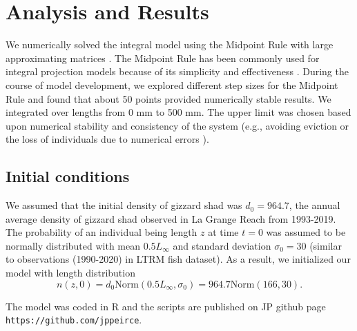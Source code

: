 \documentclass[preprint,review,12pt,authoryear]{elsarticle}
\begin{document}
\section{Analysis and Results}
We numerically solved the integral model using the Midpoint Rule with large approximating matrices \citep{burden2005numerical}. 
The Midpoint Rule has been commonly used for integral projection models because of its simplicity and effectiveness \citep{ellner2006integral, ramula2009integral,  merow2014advancing}. 
During the course of model development, we explored different step sizes for the Midpoint Rule and found that about 50 points provided numerically stable results. 
We integrated over lengths from 0 mm to 500 mm. 
The upper limit was chosen based upon numerical stability and consistency of the system (e.g., avoiding eviction or the loss of individuals due to numerical errors \citep{williams2012avoiding}). 

\subsection{Initial conditions}  We assumed that the initial density of gizzard shad was $d_0 = 964.7$, the annual average density of gizzard shad observed in La Grange Reach from 1993-2019.  
The probability of an individual being length $z$ at time $t=0$  was assumed to be normally distributed with mean $0.5L_\infty$ and standard deviation $\sigma_0 = 30$ (similar to observations (1990-2020) in LTRM fish dataset).  
As a result, we initialized our model with length distribution
\begin{equation}\label{eq:n}
 n(z,0) = d_0 \mbox{Norm} (0.5 L_\infty, \sigma_0) = 964.7 \mbox{Norm} (166, 30). 
 \end{equation}

The model was coded in R \citep{R} and the scripts are published on JP github page \verb+https://github.com/jppeirce+.
\end{document}
